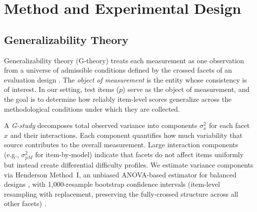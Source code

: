 \section{Method and Experimental Design}
\label{sec:method}

\subsection{Generalizability Theory}
\label{sec:gtheory}

Generalizability theory (G-theory) treats each measurement as one observation from a universe of admissible conditions defined by the crossed facets of an evaluation design \cite{shavelson1991generalizability, brennan2001generalizability}. The \emph{object of measurement} is the entity whose consistency is of interest. In our setting, test items ($p$) serve as the object of measurement, and the goal is to determine how reliably item-level scores generalize across the methodological conditions under which they are collected.

A \emph{G-study} decomposes total observed variance into components $\sigma^2_x$ for each facet $x$ and their interactions. Each component quantifies how much variability that source contributes to the overall measurement. Large interaction components (e.g., $\sigma^2_{pM}$ for item-by-model) indicate that facets do not affect items uniformly but instead create differential difficulty profiles. We estimate variance components via Henderson Method~I, an unbiased ANOVA-based estimator for balanced designs \cite[Ch.~3]{brennan2001generalizability}, with 1,000-resample bootstrap confidence intervals \cite{efron1993bootstrap} (item-level resampling with replacement, preserving the fully-crossed structure across all other facets) \cite{li2023bootstrap}.

